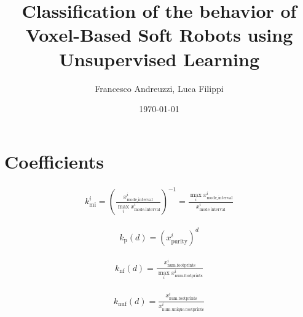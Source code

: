 \documentclass{article}
\title{Classification of the behavior of Voxel-Based Soft Robots using
    Unsupervised Learning}
\author{Francesco Andreuzzi, Luca Filippi}
\date{\today}
\begin{document}
\maketitle

\section{Coefficients}
\begin{gather}
    k_\text{mi}^i = \left(\frac{x^i_{\text{mode\_interval}}}{\max_i x^i_{\text{mode.interval}}}\right)^{-1} = \frac{\max_i x^i_{\text{mode\_interval}}}{x^i_{\text{mode.interval}}}
\end{gather}

\begin{gather}
    k_\text{p}(d) = (x_\text{purity}^i)^d
\end{gather}

\begin{gather}
    k_\text{nf}(d) = \frac{x^i_\text{num.footprints}}{\max_i x^i_\text{num.footprints}}
\end{gather}

\begin{gather}
    k_\text{nuf}(d) = \frac{x^i_\text{num.footprints}}{x^i_\text{num.unique.footprints}}
\end{gather}
\end{document}
